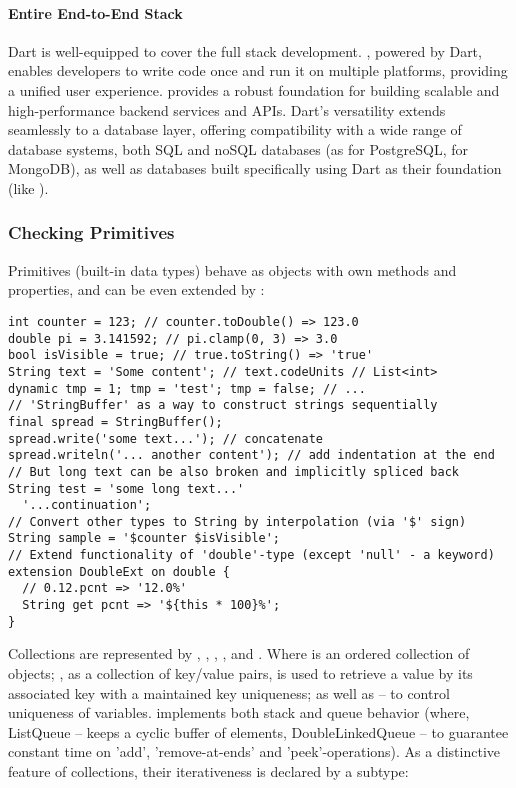 \paragraph{Entire End-to-End Stack}

Dart is well-equipped to cover the full stack development. , powered by Dart, enables developers to write 
code once and run it on multiple platforms, providing a unified user experience.  provides a robust 
foundation for building scalable and high-performance backend services and APIs. Dart's versatility extends 
seamlessly to a database layer, offering compatibility with a wide range of database systems, both SQL and 
noSQL databases (as  for PostgreSQL,  for MongoDB), as well as databases built specifically 
using Dart as their foundation (like ).


\newpage
\subsubsection{Checking Primitives} \label{dart-prim}

Primitives (built-in data types) behave as objects with own methods and properties, and can be even extended 
by :

\begin{lstlisting}
int counter = 123; // counter.toDouble() => 123.0
double pi = 3.141592; // pi.clamp(0, 3) => 3.0
bool isVisible = true; // true.toString() => 'true'
String text = 'Some content'; // text.codeUnits // List<int>
dynamic tmp = 1; tmp = 'test'; tmp = false; // ...
// 'StringBuffer' as a way to construct strings sequentially
final spread = StringBuffer();
spread.write('some text...'); // concatenate
spread.writeln('... another content'); // add indentation at the end
// But long text can be also broken and implicitly spliced back
String test = 'some long text...'
  '...continuation';
// Convert other types to String by interpolation (via '$' sign)
String sample = '$counter $isVisible';
// Extend functionality of 'double'-type (except 'null' - a keyword)
extension DoubleExt on double {
  // 0.12.pcnt => '12.0%'
  String get pcnt => '${this * 100}%';
}
\end{lstlisting}

\noindent Collections are represented by , , , , and . Where  is an 
ordered collection of objects; , as a collection of key/value pairs, is used to retrieve a value by its 
associated key with a maintained key uniqueness; as well as  -- to control uniqueness of variables.  
implements both stack and queue behavior (where, ListQueue -- keeps a cyclic buffer of elements, DoubleLinkedQueue -- 
to guarantee constant time on 'add', 'remove-at-ends' and 'peek'-operations). As a distinctive feature of collections, 
their iterativeness is declared by a subtype:

